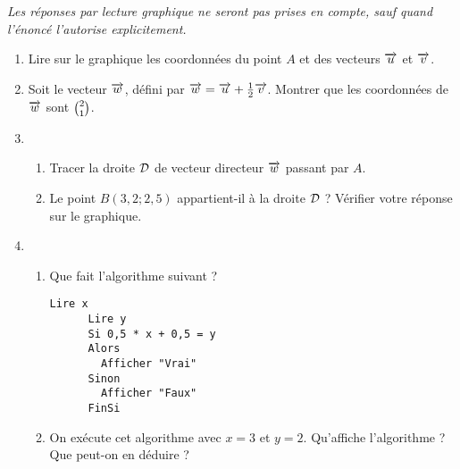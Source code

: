 \documentclass[11pt]{article}
\begin{document}
\newpage

\begin{exercice}\emph{Les réponses par lecture graphique ne seront pas prises en compte, sauf quand l'énoncé l'autorise explicitement.}

  \begin{center}
\end{center}

  \begin{enumerate}
    \item Lire sur le graphique les coordonnées du point $A$ et des vecteurs $\overrightarrow{u}$ et $\overrightarrow{v}$.
    \item Soit le vecteur $\overrightarrow{w}$, défini par $\overrightarrow{w}=\overrightarrow{u} +\frac{1}{2}\overrightarrow{v}$. Montrer que les coordonnées de $\overrightarrow{w}$ sont $\binom{2}{1}$.
    \item \begin{enumerate}
        \item Tracer la droite $\cal D$ de vecteur directeur $\overrightarrow{w}$ passant par $A$.
        \item Le point $B(3,2;2,5)$ appartient-il à la droite $\cal D$ ?
          Vérifier votre réponse sur le graphique.
      \end{enumerate}
    \item \begin{enumerate}
        \item
          Que fait l'algorithme suivant ?
      \begin{lstlisting}[language=naturel,frame=lines,mathescape=true]
      Lire x
      Lire y
      Si 0,5 * x + 0,5 = y
      Alors
        Afficher "Vrai"
      Sinon
        Afficher "Faux"
      FinSi
      \end{lstlisting}
    \item On exécute cet algorithme avec $x=3$ et $y=2$. Qu'affiche l'algorithme ? Que peut-on en déduire ?
  \end{enumerate}
  \end{enumerate}
\end{exercice}
\end{document}
